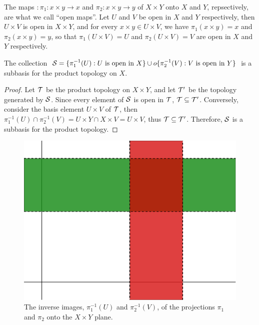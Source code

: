 \begin{example}\label{1.7}
    The maps $:\pi_1:x \times y \rightarrow x$ and $\pi_2:x \times y \rightarrow
    y$ of $X \times Y$ onto  $X$ and  $Y$, repsectively, are what we call ``open
    maps''. Let $U$ and  $V$ be open in  $X$ and  $Y$ respectively, then  $U
    \times V$ is open in  $X \times Y$, and for every  $x \times y \in U \times
    V$, we have  $\pi_1(x \times y)=x$ and $\pi_2(x \times y)=y$, so that
    $\pi_1(U \times V)=U$ and $\pi_2(U \times V)=V$ are open in $X$ and  $Y$
    respectively.
\end{example}

\begin{theorem}\label{1.4.3}
    The collection $\mathcal{S}=\{\pi_1^{-1}(U): U \text{ is open in } X\} \cup o
    \{\pi_2^{-1}(V): V \text{ is open in } Y\}$ is a subbasis for the product
    topology on $X$.
\end{theorem}
\begin{proof}
    Let $\mathcal{T}$ be the product topology on  $X \times Y$, and let  $\mathcal{T}'$ be the topology
    generated by $\mathcal{S}$. Since every element of  $\mathcal{S}$ is open in  $\mathcal{T}$,  $\mathcal{T} \subseteq \mathcal{T}'$. Conversely,
    consider the basis element  $U \times V$ of $\mathcal{T}$, then  $\pi_1^{-1}(U) \cap \pi_2^{-1}(V)=
    U \times Y \cap X \times V=U \times V$, thus $\mathcal{T} \subseteq \mathcal{T}'$. Therefore, $\mathcal{S}$ is a subbasis for the
    product topology.
\end{proof}

\begin{figure}[h]
    \centering
    \includegraphics[scale = 0.5]{Figures/Chapter1/inverse_projections.eps}
    \caption{The inverse images, $\pi_1^{-1}(U)$ and $\pi_2^{-1}(V)$, of the
    projections $\pi_1$ and $\pi_2$ onto the $X \times Y$ plane.}
    \label{fig1.5}
\end{figure}
